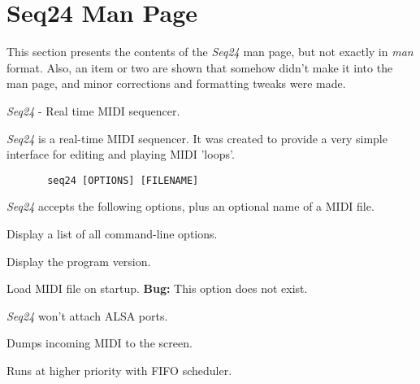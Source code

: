 %
%
%

\section{Seq24 Man Page}
\label{sec:seq24_man_page}

   This section presents the contents of the \textsl{Seq24} man page, but
   not exactly in \textsl{man} format.  Also, an item or two are shown that
   somehow didn't make it into the man page, and minor corrections and
   formatting tweaks were made.

   \textsl{Seq24} - Real time MIDI sequencer.

   \textsl{Seq24} is a real-time MIDI sequencer. It was created to provide a
   very simple interface for editing and playing MIDI 'loops'.

   \begin{verbatim}
       seq24 [OPTIONS] [FILENAME]
   \end{verbatim}

   \textsl{Seq24} accepts the following options, plus an optional name of a
   MIDI file.

   \setcounter{ItemCounter}{0}      %

      Display a list of all command-line options.

      Display the program version.

      Load MIDI file on startup.
      \textbf{Bug:}
      This option does not exist.

      \textsl{Seq24} won't attach ALSA ports.

      Dumps incoming MIDI to the screen.

      Runs at higher priority with FIFO scheduler.

